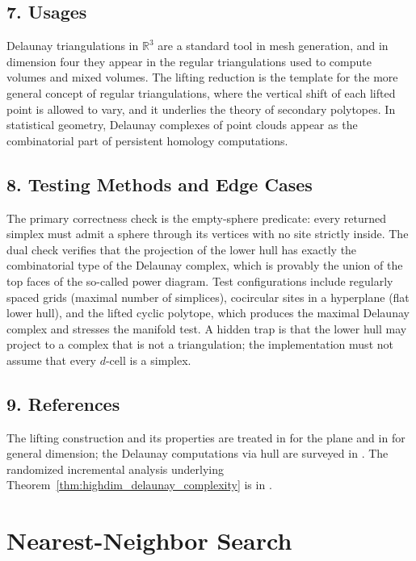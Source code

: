 \subsection{7. Usages}

Delaunay triangulations in $\mathbb{R}^3$ are a standard tool in mesh
generation, and in dimension four they appear in the regular triangulations
used to compute volumes and mixed volumes. The lifting reduction is the
template for the more general concept of regular triangulations, where the vertical shift of each lifted
point is allowed to vary, and it underlies the theory of secondary polytopes.
In statistical geometry, Delaunay complexes of point clouds appear as the
combinatorial part of persistent homology computations.

\subsection{8. Testing Methods and Edge Cases}

The primary correctness check is the empty-sphere predicate: every returned
simplex must admit a sphere through its vertices with no site strictly inside.
The dual check verifies that the projection of the lower hull has exactly the
combinatorial type of the Delaunay complex, which is provably the union of the
top faces of the so-called power diagram. Test configurations include
regularly spaced grids (maximal number of simplices), cocircular sites in a
hyperplane (flat lower hull), and the lifted cyclic polytope, which produces
the maximal Delaunay complex and stresses the manifold test. A hidden trap is
that the lower hull may project to a complex that is not a triangulation; the
implementation must not assume that every $d$-cell is a simplex.

\subsection{9. References}

The lifting construction and its properties are treated in \cite{berg2008}
for the plane and in \cite{matousek2002} for general dimension; the Delaunay
computations via hull are surveyed in \cite{deberg2008}. The randomized
incremental analysis underlying Theorem~\ref{thm:highdim_delaunay_complexity}
is in \cite{mulmuley1994}.

\section{Nearest-Neighbor Search}
\label{sec:highdim_nearest_neighbor}

